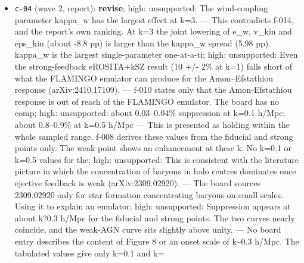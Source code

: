 \documentclass[11pt,a4paper]{article}
\begin{document}
\begin{itemize}
  \item \texttt{c-04} (wave 2, report): \textbf{revise}; high: unsupported: The wind-coupling parameter kappa\_w has the largest effect at k=3. --- This contradicts f-014, and the report's own ranking. At k=3 the joint lowering of e\_w, v\_kin and eps\_kin (about -8.8 pp) is larger than the kappa\_w spread (5.98 pp). kappa\_w is the largest single-parameter one-at-a-ti; high: unsupported: Even the strong-feedback eROSITA+kSZ result (10 +/- 2\% at k=1) falls short of what the FLAMINGO emulator can produce for the Amon--Efstathiou response (arXiv:2410.17109). --- f-010 states only that the Amon-Efstathiou response is out of reach of the FLAMINGO emulator. The board has no comp; high: unsupported: about 0.03--0.04\% suppression at k=0.1 h/Mpc; about 0.8--0.9\% at k=0.5 h/Mpc --- This is presented as holding within the whole sampled range. f-008 derives these values from the fiducial and strong points only. The weak point shows an enhancement at these k. No k=0.1 or k=0.5 values for the; high: unsupported: This is consistent with the literature picture in which the concentration of baryons in halo centres dominates once ejective feedback is weak (arXiv:2309.02920). --- The board sources 2309.02920 only for star formation concentrating baryons on small scales. Using it to explain an emulator; high: unsupported: Suppression appears at about k?0.3 h/Mpc for the fiducial and strong points. The two curves nearly coincide, and the weak-AGN curve sits slightly above unity. --- No board entry describes the content of Figure 8 or an onset scale of k\textasciitilde{}0.3 h/Mpc. The tabulated values give only k=0.1 and k=

\end{itemize}
\end{document}
